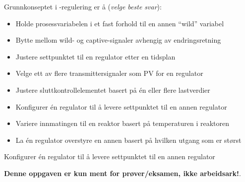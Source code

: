 

Grunnkonseptet i -regulering er å ({\it velge beste svar}):

\begin{itemize}
\item{} Holde prosessvariabelen i et fast forhold til en annen ``wild'' variabel
\vskip 5pt 
\item{} Bytte mellom wild- og captive-signaler avhengig av endringsretning
\vskip 5pt 
\item{} Justere settpunktet til en regulator etter en tidsplan
\vskip 5pt 
\item{} Velge ett av flere transmittersignaler som PV for en regulator
\vskip 5pt 
\item{} Justere sluttkontrollelementet basert på én eller flere lastverdier
\vskip 5pt 
\item{} Konfigurer én regulator til å levere settpunktet til en annen regulator
\vskip 5pt 
\item{} Variere innmatingen til en reaktor basert på temperaturen i reaktoren
\vskip 5pt 
\item{} La én regulator overstyre en annen basert på hvilken utgang som er størst
\end{itemize}







Konfigurer én regulator til å levere settpunktet til en annen regulator







{\bf Denne oppgaven er kun ment for prøver/eksamen, ikke arbeidsark!}.


